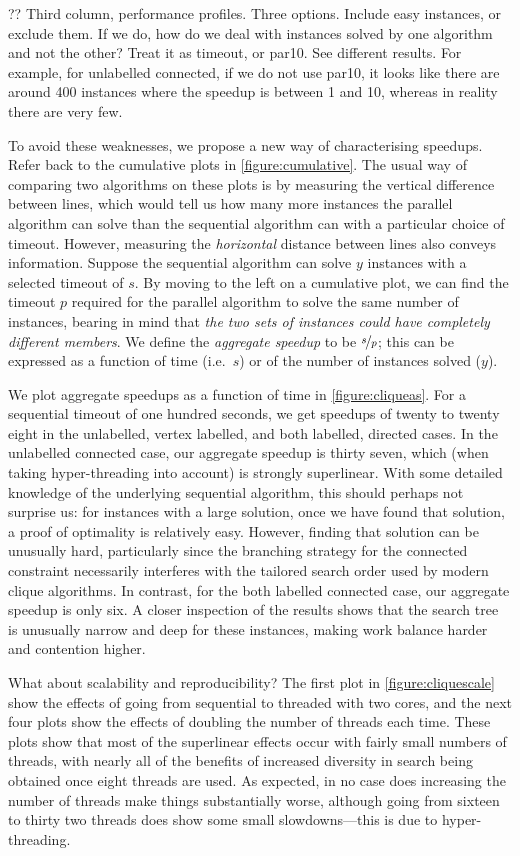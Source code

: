 \documentclass{llncs}
\begin{document}
?? Third column, performance profiles. Three options. Include easy instances, or exclude them. If we
do, how do we deal with instances solved by one algorithm and not the other? Treat it as timeout, or
par10. See different results. For example, for unlabelled connected, if we do not use par10, it
looks like there are around 400 instances where the speedup is between 1 and 10, whereas in reality
there are very few.

To avoid these weaknesses, we propose a new way of characterising speedups. Refer back to the
cumulative plots in \cref{figure:cumulative}. The usual way of comparing two algorithms on these
plots is by measuring the vertical difference between lines, which would tell us how many more
instances the parallel algorithm can solve than the sequential algorithm can with a particular
choice of timeout.  However, measuring the \emph{horizontal} distance between lines also conveys
information. Suppose the sequential algorithm can solve $y$ instances with a selected timeout of
$s$. By moving to the left on a cumulative plot, we can find the timeout $p$ required for the
parallel algorithm to solve the same number of instances, bearing in mind that \emph{the two sets of
instances could have completely different members}. We define the \emph{aggregate speedup} to be
$\nicefrac{s}{p}$; this can be expressed as a function of time (i.e.\ $s$) or of the number of
instances solved ($y$).

We plot aggregate speedups as a function of time in \cref{figure:cliqueas}. For a sequential timeout
of one hundred seconds, we get speedups of twenty to twenty eight in the unlabelled, vertex
labelled, and both labelled, directed cases. In the unlabelled connected case, our aggregate speedup
is thirty seven, which (when taking hyper-threading into account) is strongly superlinear.  With
some detailed knowledge of the underlying sequential algorithm, this should perhaps not surprise us:
for instances with a large solution, once we have found that solution, a proof of optimality is
relatively easy. However, finding that solution can be unusually hard, particularly since the
branching strategy for the connected constraint necessarily interferes with the tailored search
order used by modern clique algorithms.  In contrast, for the both labelled connected case, our
aggregate speedup is only six. A closer inspection of the results shows that the search tree is
unusually narrow and deep for these instances, making work balance harder and contention higher.

What about scalability and reproducibility? The first plot in \cref{figure:cliquescale} show the
effects of going from sequential to threaded with two cores, and the next four plots show the
effects of doubling the number of threads each time. These plots show that most of the superlinear
effects occur with fairly small numbers of threads, with nearly all of the benefits of increased
diversity in search being obtained once eight threads are used. As expected, in no case does
increasing the number of threads make things substantially worse, although going from sixteen to
thirty two threads does show some small slowdowns---this is due to hyper-threading.
\end{document}
